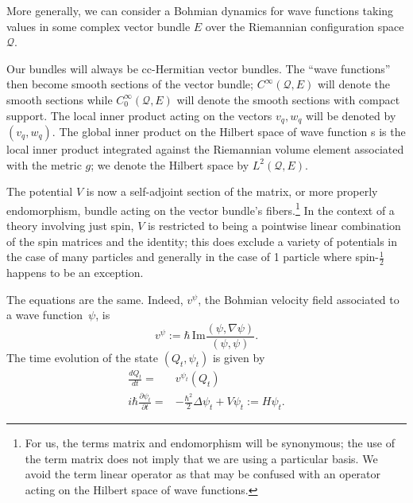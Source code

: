 \documentclass[11pt]{article}
\theoremstyle{remark}
\begin{document}
More generally, we can consider a Bohmian dynamics for wave functions taking
values in some complex vector bundle $E$ over the Riemannian
configuration space \ensuremath{\mathcal{Q}}. 


Our bundles will always be cc-Hermitian vector bundles.
The ``wave functions''
then become smooth sections of the vector bundle; $C^{\infty}
(\ensuremath{\mathcal{Q}}, E)$ will denote the smooth sections while  $C^{\infty}_0
(\ensuremath{\mathcal{Q}}, E)$ will denote the smooth sections with compact
support. 
The local inner
product acting on the vectors $v_q, w_q$ will be denoted by
\ensuremath{({v_q}, {w_q})}. The global inner product on the Hilbert space of wave function
s is the local inner product integrated against the 
Riemannian volume element associated with the metric
$g$; we denote the Hilbert space by $\ensuremath{L^{2}}(\ensuremath{\mathcal{Q}}, E)$.


The potential $V$ is now a 
self-adjoint section of the matrix, or more properly
endomorphism, bundle 
acting on the 
vector bundle's fibers.\footnote{For us, the terms matrix and 
endomorphism will be synonymous; the use of the term matrix does not
imply that we are using a particular basis. We avoid the term linear
operator as that may be confused with an operator acting on the 
Hilbert
space of wave functions. } In the context of a theory involving just spin, 
$V$ is restricted to being a pointwise linear combination of the spin
matrices and 
the identity;  this does exclude a variety of 
 potentials in the case of many particles and generally in the case of
 1 particle where spin-$\frac{1}{2}$ happens to be an exception. 

The equations are the same. Indeed,  $v^{\ensuremath{\psi}}$, 
the Bohmian velocity field associated to a
wave function\ $\ensuremath{\psi}$,  is
\begin{equation} \label{ie:vbv}
v^{\ensuremath{\psi}} \ensuremath{:=} \ensuremath{\hbar}\, \textrm{Im} \frac{\ensuremath{({\ensuremath{\psi}}, {\nabla \ensuremath{\psi}})}}{\ensuremath{({\ensuremath{\psi}}, {\ensuremath{\psi}})}}.
\end{equation}
The time evolution of 
the state $(Q_t, \ensuremath{\psi}_t)$ is given by
\begin{subequations} \label{ie:ve}
\begin{align} 
\ensuremath{\frac{d{Q_t}}{d{t}}} =& v^{\ensuremath{\psi}_t}(Q_t) \label{ie:vbe} \\
i \ensuremath{\hbar} \ensuremath{\frac{\partial {\ensuremath{\psi}_t}}{\partial {t}}} = &- \frac{\ensuremath{\hbar}^2}{2} \ensuremath{\Delta} \ensuremath{\psi}_t  + V \ensuremath{\psi}_t
 \ensuremath{:=} H \ensuremath{\psi}_t. \label{ie:vse}
\end{align}
\end{subequations}
\end{document}
